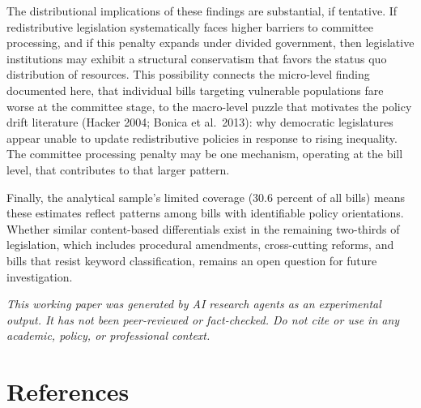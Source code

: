 \documentclass[11pt]{article}
\begin{document}
The distributional implications of these findings are substantial, if tentative. If redistributive legislation systematically faces higher barriers to committee processing, and if this penalty expands under divided government, then legislative institutions may exhibit a structural conservatism that favors the status quo distribution of resources. This possibility connects the micro-level finding documented here, that individual bills targeting vulnerable populations fare worse at the committee stage, to the macro-level puzzle that motivates the policy drift literature (Hacker 2004; Bonica et al.\ 2013): why democratic legislatures appear unable to update redistributive policies in response to rising inequality. The committee processing penalty may be one mechanism, operating at the bill level, that contributes to that larger pattern.

Finally, the analytical sample's limited coverage (30.6 percent of all bills) means these estimates reflect patterns among bills with identifiable policy orientations. Whether similar content-based differentials exist in the remaining two-thirds of legislation, which includes procedural amendments, cross-cutting reforms, and bills that resist keyword classification, remains an open question for future investigation.


\bigskip
\noindent\textit{This working paper was generated by AI research agents as an
experimental output. It has not been peer-reviewed or fact-checked.
Do not cite or use in any academic, policy, or professional context.}


\section*{References}
\end{document}
